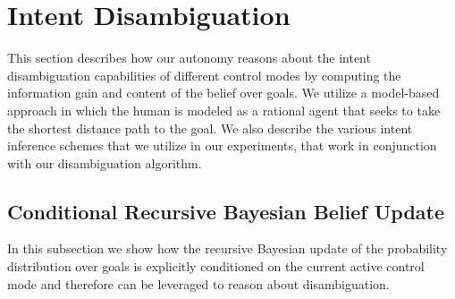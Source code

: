 \documentclass[conference]{IEEEtran}
\begin{document}
\section{Intent Disambiguation}\label{sec:disamb}
This section describes how our autonomy reasons about the intent disambiguation capabilities of different control modes by computing the information gain and content of the belief over goals. We utilize a model-based approach in which the human is modeled as a rational agent that seeks to take the shortest distance path to the goal. 
We also describe the various intent inference schemes that we utilize in our experiments, that work in conjunction with our disambiguation algorithm. 


\subsection{Conditional Recursive Bayesian Belief Update}

In this subsection we show how the recursive Bayesian update of the probability distribution over goals is explicitly conditioned on the current active control mode and therefore can be leveraged to reason about disambiguation.
\end{document}
